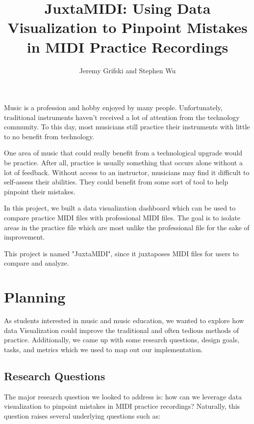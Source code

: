 \documentclass[journal]{vgtc}                %
\title{JuxtaMIDI: Using Data Visualization to Pinpoint Mistakes in MIDI Practice Recordings}
\author{Jeremy Grifski and Stephen Wu}
\begin{document}

\maketitle

Music is a profession and hobby enjoyed by many people. Unfortunately, traditional
instruments haven't received a lot of attention from the technology community. To
this day, most musicians still practice their instruments with little to no
benefit from technology.

One area of music that could really benefit from a technological upgrade would
be practice. After all, practice is usually something that occurs alone without
a lot of feedback. Without access to an instructor, musicians may find it difficult
to self-assess their abilities. They could benefit from some sort of tool
to help pinpoint their mistakes.

In this project, we built a data visualization dashboard which can be used to
compare practice MIDI files with professional MIDI files. The goal is to isolate
areas in the practice file which are most unlike the professional file for the
sake of improvement.

This project is named "JuxtaMIDI", since it juxtaposes MIDI files
for users to compare and analyze.

\section{Planning}

As students interested in music and music education, we wanted to explore how data Visualization
could improve the traditional and often tedious methods of practice. Additionally, we came up with some
research questions, design goals, tasks, and metrics which we used to map
out our implementation.

\subsection{Research Questions}

The major research question we looked to address is: how can we leverage data
visualization to pinpoint mistakes in MIDI practice recordings? Naturally,
this question raises several underlying questions such as:
\end{document}

